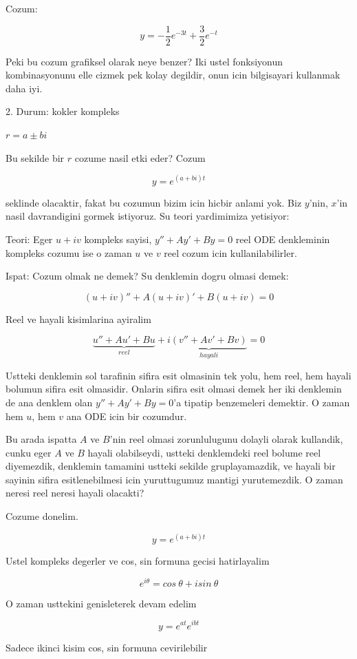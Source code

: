 \documentclass[12pt,fleqn]{article}
\begin{document}
Cozum: 

\[ y = -\frac{1}{2}e^{-3t} + \frac{3}{2}e^{-t} \]

Peki bu cozum grafiksel olarak neye benzer? Iki ustel fonksiyonun
kombinasyonunu elle cizmek pek kolay degildir, onun icin bilgisayari
kullanmak daha iyi. 

2. Durum: kokler kompleks 

$r = a \pm bi$

Bu sekilde bir $r$ cozume nasil etki eder? Cozum

\[ y = e^{(a+bi)t} \] 

seklinde olacaktir, fakat bu cozumun bizim icin hicbir anlami yok. Biz
$y$'nin, $x$'in nasil davrandigini gormek istiyoruz. Su teori yardimimiza
yetisiyor: 

Teori: Eger $u + iv$ kompleks sayisi, $y'' + Ay' + By = 0$ reel ODE
denkleminin kompleks cozumu ise o zaman $u$ ve $v$ reel cozum icin
kullanilabilirler.

Ispat: Cozum olmak ne demek? Su denklemin dogru olmasi demek: 

\[ (u+iv)'' + A(u+iv)' + B(u+iv) = 0\]

Reel ve hayali kisimlarina ayiralim

\[ 
\underbrace{u'' + Au' + Bu}_{reel} + 
i\underbrace{(v'' + Av' + Bv)}_{hayali} = 0
\]

Ustteki denklemin sol tarafinin sifira esit olmasinin tek yolu, hem reel,
hem hayali bolumun sifira esit olmasidir. Onlarin sifira esit olmasi demek
her iki denklemin de ana denklem olan $y'' + Ay' + By = 0$'a tipatip
benzemeleri demektir. O zaman hem $u$, hem $v$ ana ODE icin bir cozumdur. 

Bu arada ispatta $A$ ve $B$'nin reel olmasi zorunlulugunu dolayli olarak
kullandik, cunku eger $A$ ve $B$ hayali olabilseydi, ustteki denklemdeki
reel bolume reel diyemezdik, denklemin tamamini ustteki sekilde
gruplayamazdik, ve hayali bir sayinin sifira esitlenebilmesi icin
yuruttugumuz mantigi yurutemezdik. O zaman neresi reel neresi hayali
olacakti? 

Cozume donelim. 

\[ y = e^{(a+bi)t} \] 

Ustel kompleks degerler ve cos, sin formuna gecisi hatirlayalim

\[ e^{i\theta} = cos \ \theta + isin \ \theta \]

O zaman usttekini genisleterek devam edelim

\[ y = e^{at} e^{ibt} \]

Sadece ikinci kisim cos, sin formuna cevirilebilir
\end{document}
